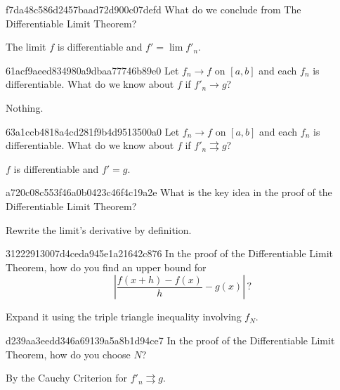 \begin{note}{f7da48c586d2457baad72d900c07defd}
    What do we conclude from The Differentiable Limit Theorem?

    \begin{cloze}{1}
        The limit \({ f }\) is differentiable and \({ f' = \lim f'_n }\).
    \end{cloze}
\end{note}

\begin{note}{61acf9aeed834980a9dbaa77746b89e0}
    Let \({ f_n \to f }\) on \({ [a, b] }\) and each \({ f_n }\) is differentiable.
    What do we know about \({ f }\) if \({ f'_n \to g }\)?

    \begin{cloze}{1}
        Nothing.
    \end{cloze}
\end{note}

\begin{note}{63a1ccb4818a4cd281f9b4d9513500a0}
    Let \({ f_n \to f }\) on \({ [a, b] }\) and each \({ f_n }\) is differentiable.
    What do we know about \({ f }\) if \({ f'_n \rightrightarrows g }\)?

    \begin{cloze}{1}
        \({ f }\) is differentiable and \({ f' = g }\).
    \end{cloze}
\end{note}

\begin{note}{a720c08c553f46a0b0423c46f4c19a2e}
    What is the key idea in the proof of the Differentiable Limit Theorem?

    \begin{cloze}{1}
        Rewrite the limit's derivative by definition.
    \end{cloze}
\end{note}

\begin{note}{31222913007d4ceda945e1a21642c876}
    In the proof of the Differentiable Limit Theorem, how do you find an upper bound for
    \[
        \left\lvert \frac{f(x + h) - f(x)}{h} - g(x) \right\rvert\,?
    \]

    \begin{cloze}{1}
        Expand it using the triple triangle inequality involving \({ f_N }\).
    \end{cloze}
\end{note}

\begin{note}{d239aa3eedd346a69139a5a8b1d94ce7}
    In the proof of the Differentiable Limit Theorem, how do you choose \({ N }\)?

    \begin{cloze}{1}
        By the Cauchy Criterion for \({ f'_n \rightrightarrows g }\).
    \end{cloze}
\end{note}

